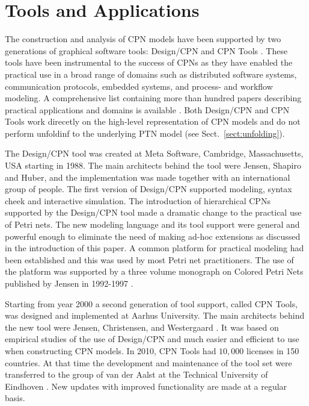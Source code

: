 \section{Tools and Applications}

The construction and analysis of CPN models have been supported by two
generations of graphical software tools: Design/CPN \cite{tacas97} and
CPN Tools \cite{cpn2003}. These tools have been instrumental to the
success of CPNs as they have enabled the practical use in a broad
range of domains such as distributed software systems, communication
protocols, embedded systems, and process- and workflow modeling. A
comprehensive list containing more than hundred papers describing
practical applications and domains is available \cite{cpnuse}. Both
Design/CPN and CPN Tools work direcetly on the high-level
representation of CPN models and do not perform unfoldinf to the
underlying PTN model (see Sect.~\ref{sect:unfolding}).

The Design/CPN tool \cite{tacas97} was created at Meta Software,
Cambridge, Massachusetts, USA starting in 1988. The main architects
behind the tool were Jensen, Shapiro and Huber, and the implementation
was made together with an international group of people. The first
version of Design/CPN supported modeling, syntax cheek and interactive
simulation. The introduction of hierarchical CPNs supported by the
Design/CPN tool made a dramatic change to the practical use of Petri
nets. The new modeling language and its tool support were general and
powerful enough to eliminate the need of making ad-hoc extensions as
discussed in the introduction of this paper. A common platform for
practical modeling had been established and this was used by most
Petri net practitioners. The use of the platform was supported by a
three volume monograph on Colored Petri Nets published by Jensen in
1992-1997 \cite{jensen:cpnvols}.

Starting from year 2000 a second generation of tool support, called
CPN Tools, was designed and implemented at Aarhus University. The main
architects behind the new tool were Jensen, Christensen, and
Westergaard \cite{cpn2003}.  It was based on empirical studies of the
use of Design/CPN and much easier and efficient to use when
constructing CPN models. In 2010, CPN Tools had $10,000$ licenses in
150 countries. At that time the development and maintenance of the
tool set were transferred to the group of van der Aalst at the
Technical University of Eindhoven \cite{cpn2003}. New updates with improved
functionality are made at a regular basis.

